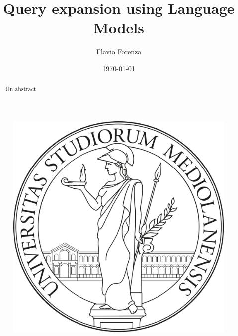 \documentclass[letterpaper,12pt]{article}
\begin{document}
    
\title{\bfseries{Query expansion using Language Models}}
\author{Flavio Forenza}
\date\today
\maketitle

\begin{figure}[h!]
  \centering
  \includegraphics[width=0.2\linewidth]{images/logoUnimi2.png}
  \centering
\end{figure}

\begin{abstract}
    Un abstract
\end{abstract}



\newpage


\newpage


\end{document}
